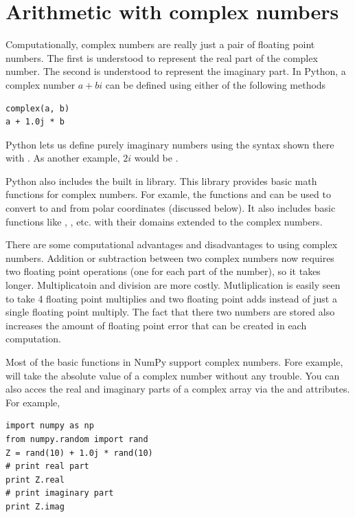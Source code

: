 

\section*{Arithmetic with complex numbers}
Computationally, complex numbers are really just a pair of floating point numbers.
The first is understood to represent the real part of the complex number.
The second is understood to represent the imaginary part.
In Python, a complex number $a + b i$ can be defined using either of the following methods
\begin{lstlisting}
complex(a, b)
a + 1.0j * b
\end{lstlisting}
Python lets us define purely imaginary numbers using the syntax shown there with .
As another example, $2 i$ would be .

Python also includes the built in  library.
This library provides basic math functions for complex numbers.
For examle, the functions  and  can be used to convert to and from polar coordinates (discussed below).
It also includes basic functions like , , etc. with their domains extended to the complex numbers.

There are some computational advantages and disadvantages to using complex numbers.
Addition or subtraction between two complex numbers now requires two floating point operations (one for each part of the number), so it takes longer.
Multiplicatoin and division are more costly.
Mutliplication is easily seen to take 4 floating point multiplies and two floating point adds instead of just a single floating point multiply.
The fact that there two numbers are stored also increases the amount of floating point error that can be created in each computation.

Most of the basic functions in NumPy support complex numbers.
Fore example,  will take the absolute value of a complex number without any trouble.
You can also acces the real and imaginary parts of a complex array via the  and  attributes.
For example,
\begin{lstlisting}
import numpy as np
from numpy.random import rand
Z = rand(10) + 1.0j * rand(10)
# print real part
print Z.real
# print imaginary part
print Z.imag
\end{lstlisting}

